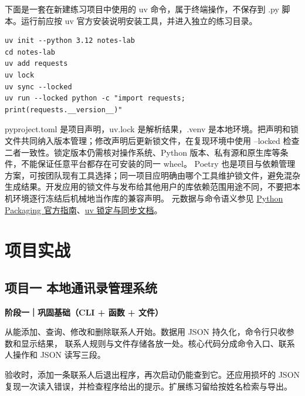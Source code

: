 \documentclass[UTF8,a4paper,oneside,openany,fontset=none,11pt]{ctexbook}
\newcommand{\BookPartIntro}{\vfill}
\newcommand{\BookPart}[4]{%
  \begingroup
  \renewcommand{\BookPartIntro}{%
    \vspace{14mm}%
    {\large\bfseries\sffamily\color{PyBlue}本篇导读\par}%
    \smallskip
    {\large\color{Ink}#2\par}%
    \medskip
    #3\par
    \vfill
    {\centering\large\sffamily\color{PyBlue}#4\par}%
    \vspace{5mm}%
  }%
  \part{#1}%
  \endgroup
}
\begin{document}
下面是一套在新建练习项目中使用的 uv 命令，属于终端操作，不保存到 .py 脚本。运行前应按 uv 官方安装说明安装工具，并进入独立的练习目录。
\begin{lstlisting}[language={},title={终端：创建与同步练习项目}]
uv init --python 3.12 notes-lab
cd notes-lab
uv add requests
uv lock
uv sync --locked
uv run --locked python -c "import requests; print(requests.__version__)"
\end{lstlisting}
pyproject.toml 是项目声明，uv.lock 是解析结果，.venv 是本地环境。把声明和锁文件共同纳入版本管理；修改声明后更新锁文件，在复现环境中使用 --locked 检查二者一致性。锁定版本仍需核对操作系统、Python 版本、私有源和原生库等条件，不能保证任意平台都存在可安装的同一 wheel。
Poetry 也是项目与依赖管理方案，可按团队现有工具选择；同一项目应明确由哪个工具维护锁文件，避免混杂生成结果。开发应用的锁文件与发布给其他用户的库依赖范围用途不同，不要把本机环境逐行冻结后机械地当作库的兼容声明。
元数据与命令语义参见 \href{https://packaging.python.org/en/latest/guides/writing-pyproject-toml/}{Python Packaging 官方指南}、\href{https://docs.astral.sh/uv/concepts/projects/sync/}{uv 锁定与同步文档}。



\BookPart{项目实战}
  {演示总挑最乖的输入。验收记得请重名联系人、坏链接和空表也来坐坐。}
  {\textbf{通讯录与批量下载。} 先完成能新增、查询、修改和删除的本地通讯录，验证重启后数据仍可读。再做多线程下载器，记录每个任务的成功、超时或失败结果。

   \textbf{清洗数据并生成报表。} 统一 Excel 或 CSV 的字段与缺失值口径，输出清洗表、工作簿和图，并核对各文件中的关键数字。

   \textbf{完成综合挑战。} 从 PyQt 资料管理器与 FastAPI 本地服务中选择一条路线，明确业务规则与数据存储方式，用正常输入和错误输入验收。}
  {把演示走过的路，留给下一位运行程序的人。}
\chapter*{项目一 本地通讯录管理系统}

\textbf{阶段一｜巩固基础（CLI + 函数 + 文件）}

从能添加、查询、修改和删除联系人开始。数据用 JSON 持久化，命令行只收参数和显示结果，
联系人规则与文件存储各放一处。核心代码分成命令入口、联系人操作和 JSON 读写三段。

验收时，添加一条联系人后退出程序，再次启动仍能查到它。还应用损坏的 JSON
复现一次读入错误，并检查程序给出的提示。扩展练习留给按姓名检索与导出。
\end{document}
